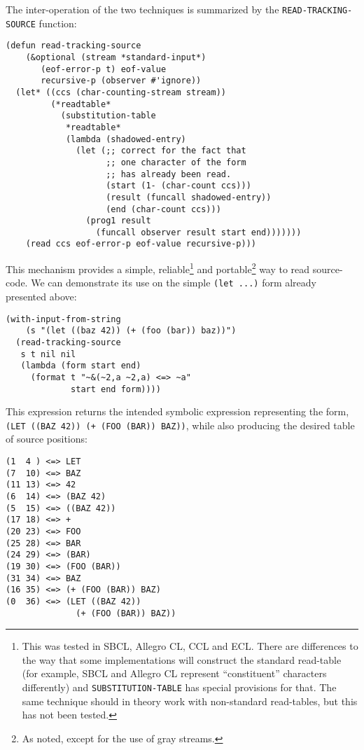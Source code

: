 \documentclass[sigconf]{acmart}
\begin{document}
The inter-operation of the two techniques is summarized by the
\texttt{READ-TRACKING-SOURCE} function:

\begin{verbatim}
(defun read-tracking-source
    (&optional (stream *standard-input*)
       (eof-error-p t) eof-value
       recursive-p (observer #'ignore))
  (let* ((ccs (char-counting-stream stream))
         (*readtable*
           (substitution-table
            *readtable*
            (lambda (shadowed-entry)
              (let (;; correct for the fact that
                    ;; one character of the form
                    ;; has already been read.
                    (start (1- (char-count ccs)))
                    (result (funcall shadowed-entry))
                    (end (char-count ccs)))
                (prog1 result
                  (funcall observer result start end)))))))
    (read ccs eof-error-p eof-value recursive-p)))
\end{verbatim}

This mechanism provides a simple, reliable\footnote{This was tested in
  SBCL, Allegro CL, CCL and ECL.  There are differences to the way
  that some implementations will construct the standard read-table
  (for example, SBCL and Allegro CL represent ``constituent''
  characters differently) and \texttt{SUBSTITUTION-TABLE} has special
  provisions for that.  The same technique should in theory work with
  non-standard read-tables, but this has not been tested.} and
portable\footnote{As noted, except for the use of gray streams.}  way
to read source-code.  We can demonstrate its use on the simple
\texttt{(let ...)} form already presented above:

\begin{verbatim}
(with-input-from-string
    (s "(let ((baz 42)) (+ (foo (bar)) baz))")
  (read-tracking-source
   s t nil nil
   (lambda (form start end)
     (format t "~&(~2,a ~2,a) <=> ~a"
             start end form))))
\end{verbatim}

This expression returns the intended symbolic expression representing
the form, \texttt{(LET ((BAZ 42)) (+ (FOO (BAR)) BAZ))}, while also
producing the desired table of source positions:

\begin{verbatim}
(1  4 ) <=> LET
(7  10) <=> BAZ
(11 13) <=> 42
(6  14) <=> (BAZ 42)
(5  15) <=> ((BAZ 42))
(17 18) <=> +
(20 23) <=> FOO
(25 28) <=> BAR
(24 29) <=> (BAR)
(19 30) <=> (FOO (BAR))
(31 34) <=> BAZ
(16 35) <=> (+ (FOO (BAR)) BAZ)
(0  36) <=> (LET ((BAZ 42))
              (+ (FOO (BAR)) BAZ))
\end{verbatim}
\end{document}
